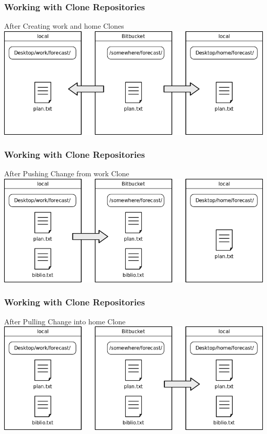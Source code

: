 \documentclass{beamer}
\begin{document}
\begin{frame}
  \frametitle{Working with Clone Repositories}
  \begin{block}{After Creating work and home Clones}
    \includegraphics[scale=0.40]{fig/hg-after-home-work-clones.png}
  \end{block}
\end{frame}


\begin{frame}
  \frametitle{Working with Clone Repositories}
  \begin{block}{After Pushing Change from work Clone}
    \includegraphics[scale=0.40]{fig/hg-after-change-to-work-clone.png}
  \end{block}
\end{frame}


\begin{frame}
  \frametitle{Working with Clone Repositories}
  \begin{block}{After Pulling Change into home Clone}
    \includegraphics[scale=0.40]{fig/hg-after-pulling-to-home-clone.png}
  \end{block}
\end{frame}
\end{document}
